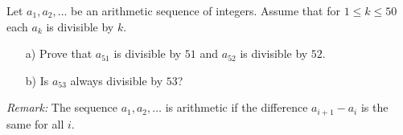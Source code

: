 Let $a_1,a_2,\ldots$ be an arithmetic sequence of integers.
Assume that for $1\leq k\leq 50$ each $a_k$ is divisible by $k$.
\begin{enumerate}
    \item[a)] Prove that $a_{51}$ is divisible by $51$ and $a_{52}$ is divisible by $52$.
    \item[b)] Is $a_{53}$ always divisible by $53$?
\end{enumerate}

\emph{Remark:} The sequence $a_1,a_2,\ldots$ is arithmetic if the difference $a_{i+1}-a_i$ is the same for all $i$.
